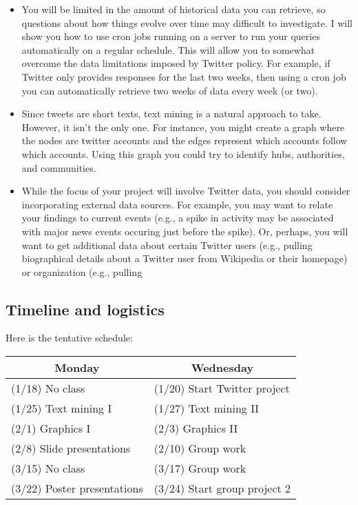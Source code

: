 \documentclass[11pt, oneside]{article}   	%
\begin{document}
\begin{itemize}

\item You will be limited in the amount of historical data you can retrieve, so
questions about how things evolve over time may difficult to investigate.  I
will show you how to use cron jobs running on a server to run your queries
automatically on a regular schedule.  This will allow you to somewhat overcome
the data limitations imposed by Twitter policy.  For example, if Twitter only
provides responses for the last two weeks, then using a cron job you can
automatically retrieve two weeks of data every week (or two).

\item Since tweets are short texts, text mining is a natural approach to take.
However, it isn't the only one.  For instance, you might create a graph where
the nodes are twitter accounts and the edges represent which accounts follow
which accounts. Using this graph you could try to identify hubs, authorities,
and communities.

\item While the focus of your project will involve Twitter data, you should
consider incorporating external data sources.  For example, you may want to
relate your findings to current events (e.g., a spike in activity may be
associated with major news events occuring just before the spike).  Or,
perhaps, you will want to get additional data about certain Twitter users
(e.g., pulling biographical details about a Twitter user from Wikipedia or
their homepage) or organization (e.g., pulling 

\end{itemize}

\subsection*{Timeline and logistics}

Here is the tentative schedule:

\begin{table}[h]
\centering
\begin{tabular}{@{}l|l@{}}
\toprule
\multicolumn{1}{c|}{Monday} & \multicolumn{1}{c}{Wednesday} \\
\hline
(1/18) No class              & (1/20) Start Twitter project \\
(1/25) Text mining I         & (1/27) Text mining II \\
(2/1) Graphics I             & (2/3) Graphics II \\
(2/8) Slide presentations    & (2/10) Group work \\
(3/15) No class              & (3/17) Group work \\                                       
(3/22) Poster presentations  & (3/24) Start group project 2 \\                                       
\bottomrule
\end{tabular}
\end{table}
\end{document}
